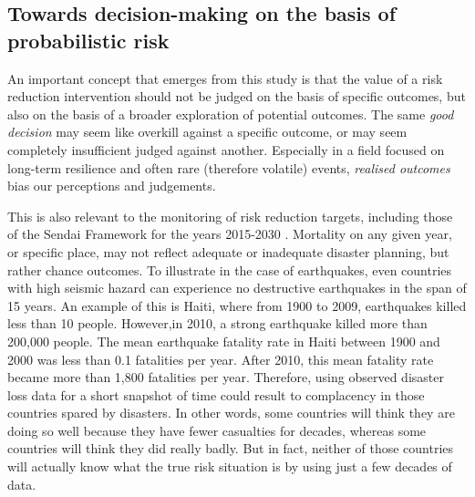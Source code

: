 


\subsection{Towards decision-making on the basis of probabilistic risk}

An important concept that emerges from this study is that the value of a risk reduction intervention should not be judged on the basis of specific outcomes, but also on the basis of a broader exploration of potential outcomes. The same \textit{good decision} may seem like overkill against a specific outcome, or may seem completely insufficient judged against another. Especially in a field focused on long-term resilience and often rare (therefore volatile) events, \textit{realised outcomes} bias our perceptions and judgements. 

This is also relevant to the monitoring of risk reduction targets, including those of the Sendai Framework for the years 2015-2030 \citep{united2015sendai}. Mortality on any given year, or specific place, may not reflect adequate or inadequate disaster planning, but rather chance outcomes. To illustrate in the case of earthquakes, even countries with high seismic hazard can experience no destructive earthquakes in the span of 15 years. An example of this is Haiti, where from 1900 to 2009, earthquakes killed less than 10 people. However,in 2010, a strong earthquake killed more than 200,000 people. The mean earthquake fatality rate in Haiti between 1900 and 2000 was less than 0.1 fatalities per year. After 2010, this mean fatality rate became more than 1,800 fatalities per year. Therefore, using observed disaster loss data for a short snapshot of time could result to complacency in those countries spared by disasters. In other words, some countries will think they are doing so well because they have fewer casualties for decades, whereas some countries will think they did really badly. But in fact, neither of those countries will actually know what the true risk situation is by using just a few decades of data.

